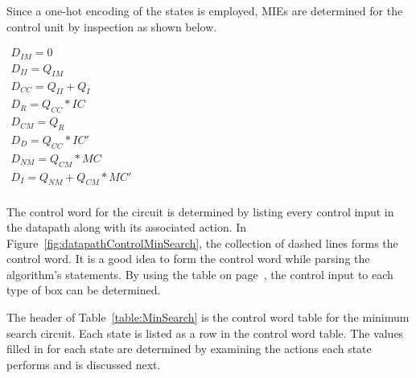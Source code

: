 Since a one-hot encoding of the states is employed, MIEs are determined 
for the control unit by inspection as shown below.

$\begin{array}{l}
D_{IM} = 0 \\
D_{II} = Q_{IM} \\
D_{CC} = Q_{II} + Q_{I} \\
D_{R}  = Q_{CC} * IC \\
D_{CM} = Q_{R}  \\
D_{D}  = Q_{CC} * IC' \\
D_{NM} = Q_{CM} * MC \\
D_{I}  = Q_{NM} + Q_{CM}*MC' \\
\end{array}$

The control word for the circuit is determined by listing every control
input in the datapath along with its associated action.  In 
Figure~\ref{fig:datapathControlMinSearch}, the collection of dashed lines forms the 
control word.  It is a good idea to form the control word while parsing 
the algorithm's statements.  By using the table on 
page~\pageref{page:boxlist}, the control input to each 
type of box can be determined.

The header of Table~\ref{table:MinSearch} is the control word table for
the minimum search circuit. Each state is listed as a row in the control 
word table.  The values filled in for each state are determined by examining
the actions each state performs and is discussed next.

